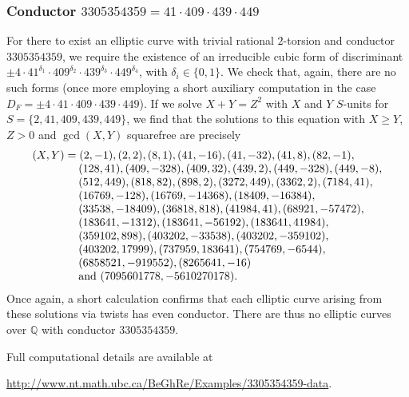 \subsubsection{Conductor $3305354359 = 41 \cdot 409 \cdot 439 \cdot 449$}

For there to exist an elliptic curve with trivial rational $2$-torsion and conductor $3305354359$, we require the existence of an irreducible cubic form of discriminant $\pm 4  \cdot 41^{\delta_1} \cdot 409^{\delta_2} \cdot 439^{\delta_3} \cdot 449^{\delta_4}$, with $\delta_i \in \{ 0, 1 \}$. We check that, again, there are no such forms (once more employing a short auxiliary computation in the case $D_F =\pm 4  \cdot 41 \cdot 409 \cdot 439 \cdot 449$). If we solve $X+Y=Z^2$ with $X$ and $Y$ $S$-units for $S = \{ 2, 41, 409, 439, 449 \}$, we find that the solutions to this equation with $X \geq Y$, $Z > 0$ and $\gcd (X,Y)$ squarefree are precisely 
$$
\begin{array}{l}
(X,Y) =  (2,-1), (2,2), (8,1), (41,-16),  (41,-32), (41,8), (82,-1), \\
 \hskip9.6ex  (128,41), (409, -328), (409, 32), (439, 2), (449, -328), (449, -8),\\
\hskip9.6ex   (512, 449),(818, 82), (898, 2), (3272, 449), (3362, 2), (7184, 41),\\
 \hskip9.6ex  (16769, -128), (16769, -14368),  (18409, -16384), \\
\hskip9.6ex   (33538, -18409),(36818, 818), (41984, 41), (68921, -57472), \\
\hskip9.6ex   (183641, -1312),(183641, -56192), (183641, 41984), \\
\hskip9.6ex  (359102, 898), (403202, -33538),(403202, -359102), \\
\hskip9.6ex (403202, 17999), (737959, 183641), (754769, -6544), \\
\hskip9.6ex (6858521, -919552), (8265641, -16) \\
\hskip9.6ex \mbox{and } (7095601778, -5610270178). \\
\end{array}
$$
Once again, a short calculation confirms that each elliptic curve arising from these solutions via twists has even conductor. There are thus no elliptic curves over $\mathbb{Q}$ with conductor $3305354359$.

Full computational details are available at
\begin{center}
\url{http://www.nt.math.ubc.ca/BeGhRe/Examples/3305354359-data}.
\end{center}

